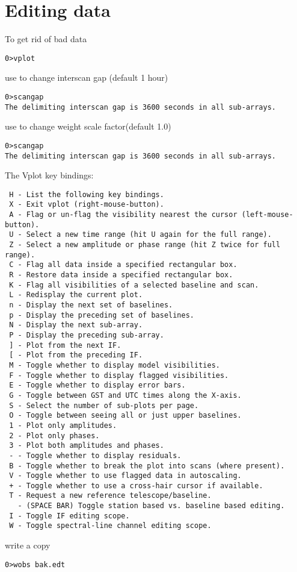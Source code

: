 \documentclass[a4paper,11pt]{article}
\begin{document}
\section{Editing data}
\par To get rid of bad data
\begin{lstlisting}
0>vplot
\end{lstlisting}
use  to change interscan gap (default 1 hour)
\scriptsize
\begin{lstlisting}
0>scangap
The delimiting interscan gap is 3600 seconds in all sub-arrays.
\end{lstlisting}
\normalsize
use  to change weight scale factor(default 1.0)
\scriptsize
\begin{lstlisting}
0>scangap
The delimiting interscan gap is 3600 seconds in all sub-arrays.
\end{lstlisting}
\normalsize
The Vplot key bindings:
\tiny
\begin{lstlisting}
 H - List the following key bindings.
 X - Exit vplot (right-mouse-button).
 A - Flag or un-flag the visibility nearest the cursor (left-mouse-button).
 U - Select a new time range (hit U again for the full range).
 Z - Select a new amplitude or phase range (hit Z twice for full range).
 C - Flag all data inside a specified rectangular box.
 R - Restore data inside a specified rectangular box.
 K - Flag all visibilities of a selected baseline and scan.
 L - Redisplay the current plot.
 n - Display the next set of baselines.
 p - Display the preceding set of baselines.
 N - Display the next sub-array.
 P - Display the preceding sub-array.
 ] - Plot from the next IF.
 [ - Plot from the preceding IF.
 M - Toggle whether to display model visibilities.
 F - Toggle whether to display flagged visibilities.
 E - Toggle whether to display error bars.
 G - Toggle between GST and UTC times along the X-axis.
 S - Select the number of sub-plots per page.
 O - Toggle between seeing all or just upper baselines.
 1 - Plot only amplitudes.
 2 - Plot only phases.
 3 - Plot both amplitudes and phases.
 - - Toggle whether to display residuals.
 B - Toggle whether to break the plot into scans (where present).
 V - Toggle whether to use flagged data in autoscaling.
 + - Toggle whether to use a cross-hair cursor if available.
 T - Request a new reference telescope/baseline.
   - (SPACE BAR) Toggle station based vs. baseline based editing.
 I - Toggle IF editing scope.
 W - Toggle spectral-line channel editing scope.
\end{lstlisting}
\normalsize
write a copy
\begin{lstlisting}
0>wobs bak.edt
\end{lstlisting}
\end{document}
